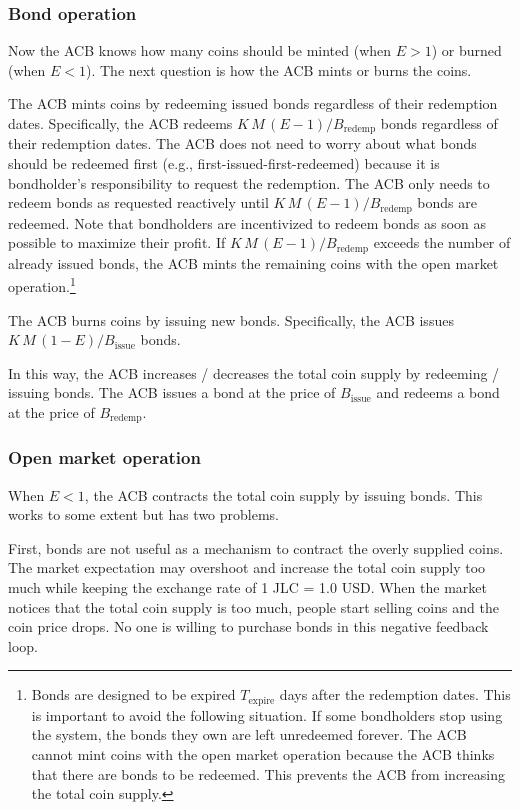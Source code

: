 \documentclass[dvipdfmx,a4paper]{article}
\begin{document}
\subsubsection{Bond operation}

Now the ACB knows how many coins should be minted (when $E>1$) or burned (when $E<1$). The next question is how the ACB mints or burns the coins.

The ACB mints coins by redeeming issued bonds regardless of their redemption dates. Specifically, the ACB redeems $K\,M\,(E-1)/B_{\mathrm{redemp}}$ bonds regardless of their redemption dates. The ACB does not need to worry about what bonds should be redeemed first (e.g., first-issued-first-redeemed) because it is bondholder's responsibility to request the redemption. The ACB only needs to redeem bonds as requested reactively until $K\,M\,(E-1)/B_{\mathrm{redemp}}$ bonds are redeemed. Note that bondholders are incentivized to redeem bonds as soon as possible to maximize their profit. If $K\,M\,(E-1)/B_{\mathrm{redemp}}$ exceeds the number of already issued bonds, the ACB mints the remaining coins with the open market operation.\footnote{Bonds are designed to be expired $T_{\mathrm{expire}}$ days after the redemption dates. This is important to avoid the following situation. If some bondholders stop using the system, the bonds they own are left unredeemed forever. The ACB cannot mint coins with the open market operation because the ACB thinks that there are bonds to be redeemed. This prevents the ACB from increasing the total coin supply.}

The ACB burns coins by issuing new bonds. Specifically, the ACB issues $K\,M\,(1-E)/B_{\mathrm{issue}}$ bonds.

In this way, the ACB increases / decreases the total coin supply by redeeming / issuing bonds. The ACB issues a bond at the price of $B_{\mathrm{issue}}$ and redeems a bond at the price of $B_{\mathrm{redemp}}$.

\subsubsection{Open market operation}

When $E<1$, the ACB contracts the total coin supply by issuing bonds. This works to some extent but has two problems.

First, bonds are not useful as a mechanism to contract the overly supplied coins. The market expectation may overshoot and increase the total coin supply too much while keeping the exchange rate of 1 JLC = 1.0 USD. When the market notices that the total coin supply is too much, people start selling coins and the coin price drops. No one is willing to purchase bonds in this negative feedback loop.
\end{document}
